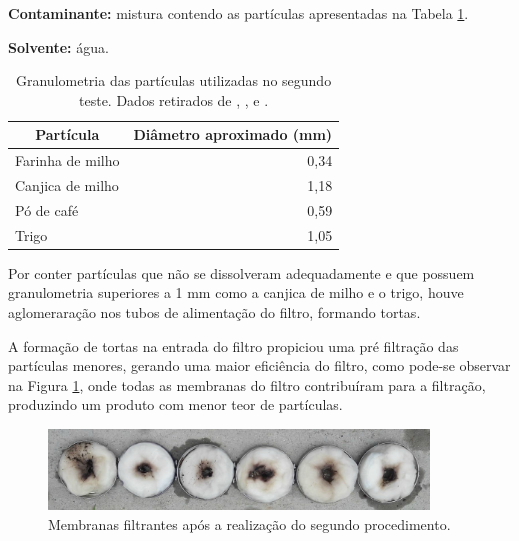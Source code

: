 \textbf{Contaminante:} mistura contendo as partículas apresentadas na Tabela
\ref{granulometria2}.

\textbf{Solvente:} água.


\begin{table}[H]
\centering
\caption{Granulometria das partículas utilizadas no segundo teste. Dados
  retirados de ,
  ,  e .}
\label{granulometria2}
\begin{tabular}{@{}lr@{}}
\toprule
\multicolumn{1}{c}{\textbf{Partícula}} & \multicolumn{1}{c}{\textbf{Diâmetro aproximado (\si{mm})}} \\ \midrule
Farinha de milho                       & 0,34                                                 \\
Canjica de milho                       & 1,18                                                 \\
Pó de café                             & 0,59                                                 \\
Trigo                                  & 1,05                                                 \\  \bottomrule
\end{tabular}
\end{table}

Por conter partículas que não se dissolveram adequadamente e que possuem
granulometria superiores a 1 \si{mm} como a canjica de milho e o trigo, houve
aglomeraração nos tubos de alimentação do filtro, formando tortas.

A formação de tortas na entrada do filtro propiciou uma pré filtração das
partículas menores, gerando uma maior eficiência do filtro, como pode-se
observar na Figura \ref{fig:proc2}, onde todas as membranas do filtro contribuíram para a
filtração, produzindo um produto com menor teor de partículas.

\begin{figure}[H]
  \centering
  \includegraphics[width=0.9\textwidth]{figuras/proc2.png}
  \caption{Membranas filtrantes após a realização do segundo
    procedimento.\label{fig:proc2}}
\end{figure}

